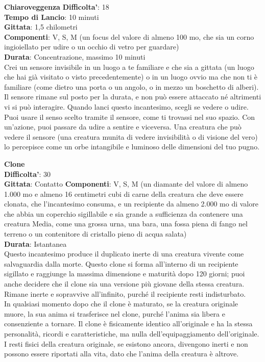 \begin{multicols}{2}
\medskip\textbf{Chiaroveggenza}
\textbf{Difficolta'}: 18\\
\textbf{Tempo di Lancio}: 10 minuti\\
\textbf{Gittata}: 1,5 chilometri\\
\textbf{Componenti}: V, S, M (un focus del valore di almeno 100 mo, che sia un corno ingioiellato per udire o un occhio di vetro per guardare)\\
\textbf{Durata}: Concentrazione, massimo 10 minuti\\
Crei un sensore invisibile in un luogo a te familiare e che sia a gittata (un luogo che hai già visitato o visto precedentemente) o in un luogo ovvio ma che non ti è familiare (come dietro una porta o un angolo, o in mezzo un boschetto di alberi). Il sensore rimane sul posto per la durata, e non può essere attaccato né altrimenti vi si può interagire. Quando lanci questo incantesimo, scegli se vedere o udire. Puoi usare il senso scelto tramite il sensore, come ti trovassi nel suo spazio. Con un’azione, puoi passare da udire a sentire e viceversa. Una creatura che può vedere il sensore (una creatura munita di vedere invisibilità o di visione del vero) lo percepisce come un orbe intangibile e luminoso delle dimensioni del tuo pugno.

\medskip\textbf{Clone}\\
\textbf{Difficolta'}: 30\\
\textbf{Gittata}: Contatto
\textbf{Componenti}: V, S, M (un diamante del valore di almeno 1.000 mo e almeno 16 centimetri cubi di carne della creatura che deve essere clonata, che l’incantesimo consuma, e un recipiente da almeno 2.000 mo di valore che abbia un coperchio sigillabile e sia grande a sufficienza da contenere una creatura Media, come una grossa urna, una bara, una fossa piena di fango nel terreno o un contenitore di cristallo pieno di acqua salata)\\
\textbf{Durata}: Istantanea\\
Questo incantesimo produce il duplicato inerte di una creatura vivente come salvaguardia dalla morte. Questo clone si forma all’interno di un recipiente sigillato e raggiunge la massima dimensione e maturità dopo 120 giorni; puoi anche decidere che il clone sia una versione più giovane della stessa creatura. Rimane inerte e sopravvive all’infinito, purché il recipiente resti indisturbato.\\
In qualsiasi momento dopo che il clone è maturato, se la creatura originale muore, la sua anima si trasferisce nel clone, purché l’anima sia libera e consenziente a tornare. Il clone è fisicamente identico all’originale e ha la stessa personalità, ricordi e caratteristiche, ma nulla dell’equipaggiamento dell’originale. I resti fisici della creatura originale, se esistono ancora, divengono inerti e non possono essere riportati alla vita, dato che l’anima della creatura è altrove. 


\end{multicols}
